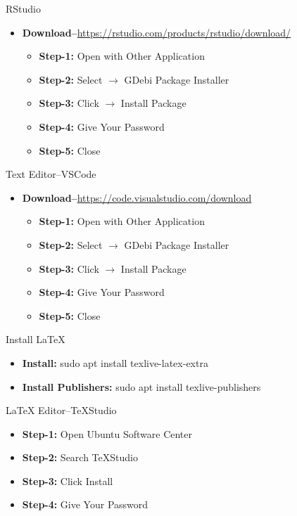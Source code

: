 \begin{frame}[t]{RStudio}
	\begin{itemize}
		\item 
		\textbf{Download--}\url{https://rstudio.com/products/rstudio/download/}
			\begin{itemize}
			\item \textbf{Step-1:}  Open with Other Application 
			\item \textbf{Step-2:}  Select $\rightarrow$ GDebi Package Installer
			\item \textbf{Step-3:}  Click $\rightarrow$ Install Package 
			\item \textbf{Step-4:}  Give Your Password 
			\item \textbf{Step-5:}  Close 
		\end{itemize}
	\end{itemize}
\end{frame}
\begin{frame}[t]{Text Editor--VSCode}
		\begin{itemize}
		\item 
		\textbf{Download--}\url{https://code.visualstudio.com/download}
		\begin{itemize}
		\item \textbf{Step-1:}  Open with Other Application 
		\item \textbf{Step-2:}  Select $\rightarrow$ GDebi Package Installer
		\item \textbf{Step-3:}  Click $\rightarrow$ Install Package 
		\item \textbf{Step-4:}  Give Your Password 
		\item \textbf{Step-5:}  Close 
	\end{itemize}
	\end{itemize}
\end{frame}

\begin{frame}[t]{Install \LaTeX}
	\begin{itemize}
		\item \textbf{Install:} sudo apt install texlive-latex-extra
		\item \textbf{Install Publishers:} sudo apt install 
		texlive-publishers
	\end{itemize}
\end{frame}


\begin{frame}[t]{{\LaTeX} Editor--TeXStudio}
	\begin{itemize}
		\item \textbf{Step-1:} Open Ubuntu Software Center
		\item \textbf{Step-2:} Search TeXStudio
		\item \textbf{Step-3:} Click Install 
		\item \textbf{Step-4:} Give Your Password 
	\end{itemize}
\end{frame}


